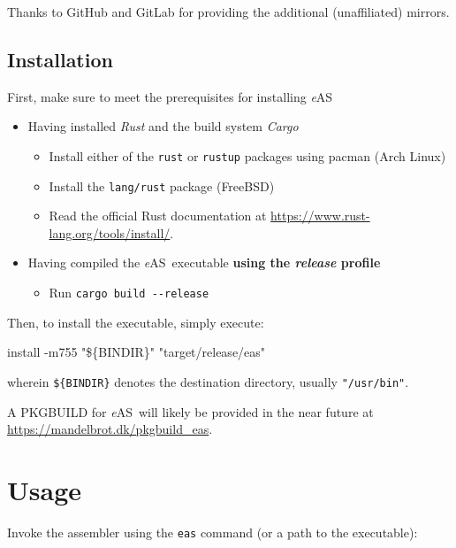 \documentclass[a4paper]{article}
\newcommand*{\eAS}{\textup{\textit{e}AS}}
\begin{document}
			Thanks to GitHub and GitLab for providing the additional (unaffiliated) mirrors.

		\subsection{Installation}
			\label{sec:setup:installation}
			First, make sure to meet the prerequisites for installing \eAS\:

			\begin{itemize}
				\item Having installed \textit{Rust} and the build system \textit{Cargo}
				\begin{itemize}
					\item Install either of the \texttt{rust} or \texttt{rustup} packages using pacman (Arch Linux)
					\item Install the \texttt{lang/rust} package (FreeBSD)
					\item Read the official Rust documentation at \url{https://www.rust-lang.org/tools/install/}.
				\end{itemize}
				\item Having compiled the \eAS\ executable \textbf{using the \textit{release} profile}
				\begin{itemize}
					\item Run \texttt{cargo build -{}-release}
				\end{itemize}
			\end{itemize}

			Then, to install the executable, simply execute:

			\begin{center}
				\begin{varwidth}{\linewidth}
					\ttfamily
					install -m755 "\$\{BINDIR\}" "target/release/eas"
				\end{varwidth}
			\end{center}

			wherein \texttt{\$\{BINDIR\}} denotes the destination directory, usually \texttt{"/usr/bin"}.

			A PKGBUILD for \eAS\ will likely be provided in the near future at \url{https://mandelbrot.dk/pkgbuild_eas}.

	\clearpage
	\section{Usage}
		\label{sec:usage}
		Invoke the assembler using the \texttt{eas} command (or a path to the executable):
\end{document}
